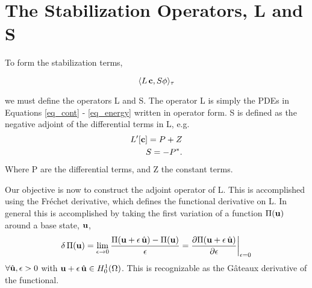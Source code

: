 %
%
\section{The Stabilization Operators, L and S}


To form the stabilization terms, 

\begin{equation}
 \langle L\,{\bf c},S{\bf \phi} \rangle_\tau
\end{equation}

we must define the operators L and S. The operator L is simply the PDEs
in Equations \ref{eq_cont} - \ref{eq_energy} written in operator form. S is
defined as the negative adjoint of the differential terms in L, e.g.
\begin{align}
 L'[{\bf c}] = P + Z \\
 S = -P^*. 
\end{align}
Where P are the differential terms, and Z the constant terms. 

Our objective is now to construct the adjoint operator of L. This is
accomplished using the Fr\'echet derivative, which defines the
functional derivative on L. In general this is accomplished by taking
the first variation of a function $\Pi({\bf u})$ around a base state, ${\bf u}$,
\begin{equation}
 \delta\, \Pi({\bf u}) = \lim_{\epsilon \to 0} \frac{\Pi({\bf
  u}+\epsilon \, \hat {\bf u}) -
  \Pi({\bf u})}{\epsilon} =
  \frac{\partial \Pi({\bf u} +\epsilon \, \hat {\bf u})}{\partial \epsilon}
  \bigg|_{\epsilon = 0}
\end{equation}
$\forall \hat {\bf u}, \epsilon > 0$ with ${\bf u} + \epsilon \, \hat {\bf u} \in
H^1_0(\Omega)$. This is recognizable as the G\^{a}teaux
derivative of the functional. 

